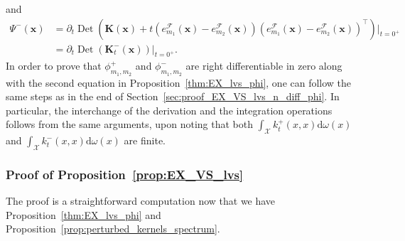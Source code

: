 \documentclass[twoside,11pt]{book}
\numberwithin{theorem}{chapter}
\numberwithin{definition}{chapter}
\numberwithin{proposition}{chapter}
\numberwithin{corollary}{chapter}
\numberwithin{example}{chapter}
\numberwithin{lemma}{chapter}
\DeclareMathOperator{\Det}{Det}
\DeclareMathOperator{\Tran}{\intercal}
\DeclareMathOperator{\X}{\mathcal{X}}
\newcommand{\ab}[1]{\textcolor{red}{#1}}
\begin{document}
and
\begin{align}
\Psi^{-}(\bm{x}) & = \partial_{t} \Det \left(\bm{K}(\bm{x})+t \left(e_{m_{1}}^{\mathcal{F}}(\bm{x}) - e_{m_{2}}^{\mathcal{F}}(\bm{x}) \right)\left(e_{m_{1}}^{\mathcal{F}}(\bm{x}) - e_{m_{2}}^{\mathcal{F}}(\bm{x}) \right)^{\Tran} \right)|_{t = 0^{+}} \nonumber \\
& = \partial_{t} \Det \left(\bm{K}_{t}^{-}(\bm{x})\right)|_{t = 0^{+}}.
\end{align}
In order to prove that $\phi_{m_{1},m_{2}}^{+}$ and $\phi_{m_{1},m_{2}}^{-}$ are right differentiable in zero along with the second equation in Proposition~\ref{thm:EX_lvs_phi}, one can follow the same steps as in the end of Section~\ref{sec:proof_EX_VS_lvs_n_diff_phi}. In particular, the interchange of the derivation and the integration operations follows from the same arguments, upon noting that both $\int_{\X} k_{t}^{+}(x,x) \mathrm{d}\omega(x)$ and $\int_{\X} k_{t}^{-}(x,x) \mathrm{d}\omega(x)$ are finite.



\subsubsection{Proof of Proposition~\ref{prop:EX_VS_lvs}}\label{sec:proof_EX_VS_lvs}
The proof is a straightforward computation now that we have Proposition~\ref{thm:EX_lvs_phi} and Proposition~\ref{prop:perturbed_kernels_spectrum}.
\end{document}
